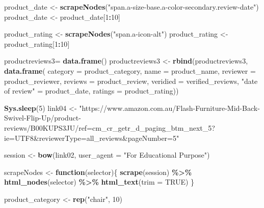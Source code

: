 \documentclass[
]{article}
\newenvironment{Shaded}{\begin{snugshade}}{\end{snugshade}}
\newcommand{\AttributeTok}[1]{\textcolor[rgb]{0.13,0.29,0.53}{#1}}
\newcommand{\ConstantTok}[1]{\textcolor[rgb]{0.56,0.35,0.01}{#1}}
\newcommand{\ControlFlowTok}[1]{\textcolor[rgb]{0.13,0.29,0.53}{\textbf{#1}}}
\newcommand{\DecValTok}[1]{\textcolor[rgb]{0.00,0.00,0.81}{#1}}
\newcommand{\FunctionTok}[1]{\textcolor[rgb]{0.13,0.29,0.53}{\textbf{#1}}}
\newcommand{\NormalTok}[1]{#1}
\newcommand{\OtherTok}[1]{\textcolor[rgb]{0.56,0.35,0.01}{#1}}
\newcommand{\SpecialCharTok}[1]{\textcolor[rgb]{0.81,0.36,0.00}{\textbf{#1}}}
\newcommand{\StringTok}[1]{\textcolor[rgb]{0.31,0.60,0.02}{#1}}
\begin{document}
\begin{Shaded}
\begin{Highlighting}[]
\NormalTok{  product\_date }\OtherTok{\textless{}{-}} \FunctionTok{scrapeNodes}\NormalTok{(}\StringTok{"span.a{-}size{-}base.a{-}color{-}secondary.review{-}date"}\NormalTok{)}
\NormalTok{  product\_date }\OtherTok{\textless{}{-}}\NormalTok{ product\_date[}\DecValTok{1}\SpecialCharTok{:}\DecValTok{10}\NormalTok{]}
  
\NormalTok{  product\_rating }\OtherTok{\textless{}{-}} \FunctionTok{scrapeNodes}\NormalTok{(}\StringTok{"span.a{-}icon{-}alt"}\NormalTok{)}
\NormalTok{  product\_rating }\OtherTok{\textless{}{-}}\NormalTok{ product\_rating[}\DecValTok{1}\SpecialCharTok{:}\DecValTok{10}\NormalTok{]}
  
\NormalTok{  productreviews3}\OtherTok{=} \FunctionTok{data.frame}\NormalTok{()}
\NormalTok{  productreviews3 }\OtherTok{\textless{}{-}} \FunctionTok{rbind}\NormalTok{(productreviews3, }\FunctionTok{data.frame}\NormalTok{(}
                      \AttributeTok{category =}\NormalTok{ product\_category,}
                      \AttributeTok{name =}\NormalTok{ product\_name,}
                      \AttributeTok{reviewer =}\NormalTok{ product\_reviewer,}
                      \AttributeTok{reviews =}\NormalTok{ product\_review,}
                      \AttributeTok{veridied =}\NormalTok{ verified\_reviews,}
                      \StringTok{"date of review"} \OtherTok{=}\NormalTok{ product\_date,}
                      \AttributeTok{ratings =}\NormalTok{ product\_rating))}
  
   \FunctionTok{Sys.sleep}\NormalTok{(}\DecValTok{5}\NormalTok{)}
\NormalTok{link04 }\OtherTok{\textless{}{-}} \StringTok{"https://www.amazon.com.au/Flash{-}Furniture{-}Mid{-}Back{-}Swivel{-}Flip{-}Up/product{-}reviews/B00KUPS3JU/ref=cm\_cr\_getr\_d\_paging\_btm\_next\_5?ie=UTF8\&reviewerType=all\_reviews\&pageNumber=5"}


\NormalTok{  session }\OtherTok{\textless{}{-}} \FunctionTok{bow}\NormalTok{(link02,}
               \AttributeTok{user\_agent =} \StringTok{"For Educational Purpose"}\NormalTok{)}

\NormalTok{  scrapeNodes }\OtherTok{\textless{}{-}} \ControlFlowTok{function}\NormalTok{(selector)\{}
    \FunctionTok{scrape}\NormalTok{(session) }\SpecialCharTok{\%\textgreater{}\%}
      \FunctionTok{html\_nodes}\NormalTok{(selector) }\SpecialCharTok{\%\textgreater{}\%}
      \FunctionTok{html\_text}\NormalTok{(}\AttributeTok{trim =} \ConstantTok{TRUE}\NormalTok{)}
\NormalTok{  \}}

\NormalTok{  product\_category }\OtherTok{\textless{}{-}} \FunctionTok{rep}\NormalTok{(}\StringTok{"chair"}\NormalTok{, }\DecValTok{10}\NormalTok{)}


\end{Highlighting}
\end{Shaded}
\end{document}
